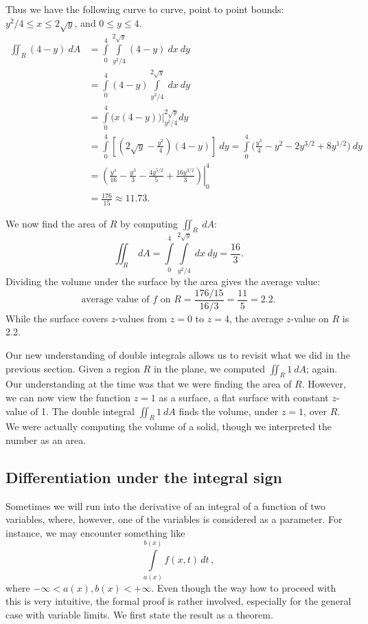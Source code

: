 \begin{example}
Thus we have the following curve to curve, point to point bounds: $y^2/4\leq x\leq 2\sqrt y$, and $0\leq y\leq 4$. 
\begin{align*}
\iint_R (4-y)\ dA &= \int\limits_0^4\int\limits_{y^2/4}^{2\sqrt{y}}(4-y)\ dx\ dy\\
&= \int\limits_0^4(4-y)\int\limits_{y^2/4}^{2\sqrt{y}}\ dx\ dy\\
				&= \int\limits_0^4 \big(x(4-y)\big)\Big|_{y^2/4}^{2\sqrt{y}} dy\\
				&= \int\limits_0^4 \left[\left(2\sqrt{y}-\frac{y^2}{4}\right)(4-y)\right]\ dy = \int\limits_0^4 \Big( \frac{y^3}{4}-y^2-2y^{3/2}+8y^{1/2}\Big)\ dy\\
				&= \left.\left(\frac{y^4}{16}-\frac{y^3}{3}-\frac{4y^{5/2}}5+\frac{16y^{3/2}}3\right)\right|_0^4\\
				&= \frac{176}{15} \approx 11.73.
\end{align*}



We now find the area of $R$ by computing $\iint_R \ dA$:
$$\iint_R \ dA = \int\limits_0^4\int\limits_{y^2/4}^{2\sqrt{y}} \ dx\ dy = \frac{16}{3}.$$
Dividing the volume under the surface by the area gives the average value:
$$\text{average value of $f$ on $R$} = \frac{176/15}{16/3} = \frac{11}5 = 2.2.$$
While the surface covers $z$-values from $z=0$ to $z=4$, the average $z$-value on $R$ is 2.2.
\end{example}

Our new understanding of double integrals allows us to revisit what we did in the previous section. Given a region $R$ in the plane, we computed $\iint_R 1\ dA$; again. Our understanding at the time was that we were finding the area of $R$. However, we can now view the function $z=1$ as a surface, a flat surface with constant $z$-value of 1. The double integral $\iint_R 1\ dA$ finds the volume, under $z=1$, over $R$. We were actually computing the volume of a solid, though we interpreted the number as an area.



\subsection{Differentiation under the integral sign}\label{sec:afl_Leibniz}
Sometimes we will run into the derivative of an integral of a function of two variables, where, however, one of the variables is considered as a parameter. For instance, we may encounter something like 
$$
\displaystyle \int\limits_{a(x)}^{b(x)}f(x,t)\,dt\,,
$$
where $ -\infty <a(x),b(x)<+\infty$. Even though the way how to proceed with this is very intuitive, the formal proof is rather involved, especially for the general case with variable limits. We first state the result as a theorem. 

